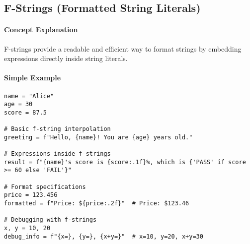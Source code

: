 \subsection{F-Strings (Formatted String Literals)}

\paragraph{Concept Explanation}
F-strings provide a readable and efficient way to format strings by embedding expressions directly inside string literals.

\paragraph{Simple Example}
\begin{lstlisting}[caption=F-String Examples]
name = "Alice"
age = 30
score = 87.5

# Basic f-string interpolation
greeting = f"Hello, {name}! You are {age} years old."

# Expressions inside f-strings
result = f"{name}'s score is {score:.1f}%, which is {'PASS' if score >= 60 else 'FAIL'}"

# Format specifications
price = 123.456
formatted = f"Price: ${price:.2f}"  # Price: $123.46

# Debugging with f-strings
x, y = 10, 20
debug_info = f"{x=}, {y=}, {x+y=}"  # x=10, y=20, x+y=30
\end{lstlisting}

